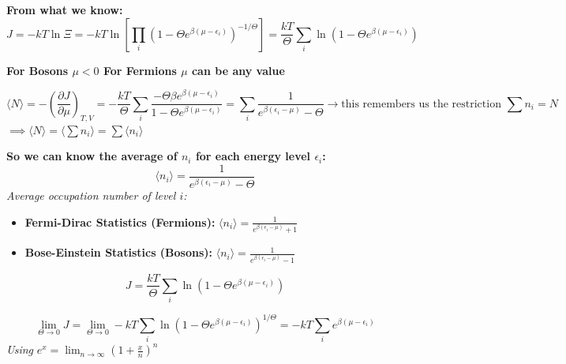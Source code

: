 \documentclass[12pt,a4paper]{report}
\newcommand{\esp}{\vspace{0.5cm}}
\begin{document}
	\esp
	
	\textbf{From what we know:}
	\begin{equation}
		J = -kT \ln \Xi = -kT \ln \left[ \prod_i (1 - \Theta e^{\beta(\mu - \epsilon_i)})^{-1/\Theta} \right] = \frac{kT}{\Theta} \sum_i \ln(1 - \Theta e^{\beta(\mu - \epsilon_i)})
	\end{equation}
	
	\esp
	
	\begin{center}
		\textbf{For Bosons $\mu < 0$ \quad For Fermions $\mu$ can be any value}
	\end{center}
	
	\esp
	
	\begin{equation}
		\langle N \rangle = - \left( \frac{\partial J}{\partial \mu} \right)_{T, V} = -\frac{kT}{\Theta} \sum_i \frac{-\Theta \beta e^{\beta(\mu - \epsilon_i)}}{1 - \Theta e^{\beta(\mu - \epsilon_i)}} = \sum_i \frac{1}{e^{\beta(\epsilon_i - \mu)} - \Theta} \to \text{this remembers us the restriction } \sum n_i = N
	\end{equation}
	$\implies \langle N \rangle = \langle \sum n_i \rangle = \sum \langle n_i \rangle$
	
	\esp
	
	\textbf{So we can know the average of $n_i$ for each energy level $\epsilon_i$:}
	\begin{equation}
		\langle n_i \rangle = \frac{1}{e^{\beta(\epsilon_i - \mu)} - \Theta}
	\end{equation}
	\textit{Average occupation number of level $i$:}
	
	\esp
	
	\begin{itemize}
		\item \textbf{Fermi-Dirac Statistics (Fermions):} $\langle n_i \rangle = \frac{1}{e^{\beta(\epsilon_i - \mu)} + 1}$
		\item \textbf{Bose-Einstein Statistics (Bosons):} $\langle n_i \rangle = \frac{1}{e^{\beta(\epsilon_i - \mu)} - 1}$
	\end{itemize}
	
	\esp
	
	
	\esp
	
	\begin{equation}
		J = \frac{kT}{\Theta} \sum_i \ln(1 - \Theta e^{\beta(\mu - \epsilon_i)})
	\end{equation}
	
	\esp
	
	\begin{equation}
		\lim_{\Theta \to 0} J = \lim_{\Theta \to 0} -kT \sum_i \ln(1 - \Theta e^{\beta(\mu - \epsilon_i)})^{1/\Theta} = -kT \sum_i e^{\beta(\mu - \epsilon_i)}
	\end{equation}
	\textit{Using } $e^x = \lim_{n \to \infty} (1 + \frac{x}{n})^n$
	
\end{document}
